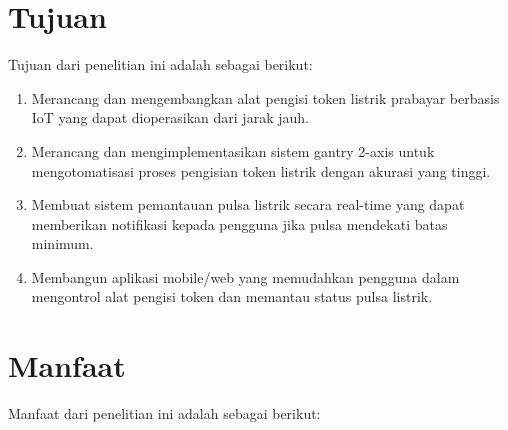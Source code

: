 \section{Tujuan}

Tujuan dari penelitian ini adalah sebagai berikut:

\begin{enumerate}
    \item Merancang dan mengembangkan alat pengisi token listrik prabayar berbasis IoT yang dapat dioperasikan dari jarak jauh.
    \item Merancang dan mengimplementasikan sistem gantry 2-axis untuk mengotomatisasi proses pengisian token listrik dengan akurasi yang tinggi.
    \item Membuat sistem pemantauan pulsa listrik secara real-time yang dapat memberikan notifikasi kepada pengguna jika pulsa mendekati batas minimum.
    \item Membangun aplikasi mobile/web yang memudahkan pengguna dalam mengontrol alat pengisi token dan memantau status pulsa listrik.
\end{enumerate}

\section{Manfaat}

Manfaat dari penelitian ini adalah sebagai berikut:

